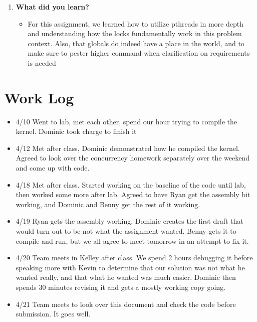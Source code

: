 \documentclass[IEEEtran,letterpaper,10pt,notitlepage,draftclsnofoot,onecolumn]{article}
\begin{document}
\begin{enumerate}
\item \textbf{What did you learn?}
\begin{itemize}
\item For this assignment, we learned how to utilize pthreads in more 
  depth and understanding how the locks fundamentally work in this problem context.
  Also, that globals do indeed have a place in the world, and to make sure to pester
  higher command when clarification on requirements is needed
\end{itemize}
\end{enumerate}

\section{Work Log}
\begin{itemize}
\item 4/10 Went to lab, met each other, spend our hour trying to compile the kernel. Dominic took charge to finish it
\item 4/12 Met after class, Dominic demonstrated how he compiled the kernel. Agreed to look over the concurrency homework separately over the weekend and come up with code.
\item 4/18 Met after class. Started working on the baseline of the code until lab, then worked some more after lab. Agreed to have Ryan get the assembly bit working, and Dominic and Benny get the rest of it working.
\item 4/19 Ryan gets the assembly working, Dominic creates the first draft that would turn out to be not what the assignment wanted. Benny gets it to compile and run, but we all agree to meet tomorrow in an attempt to fix it.
\item 4/20 Team meets in Kelley after class. We spend 2 hours debugging it before speaking more with Kevin to determine that our solution was not what he wanted really, and that what he wanted was much easier. Dominic then spends 30 minutes revising it and gets a mostly working copy going.
\item 4/21 Team meets to look over this document and check the code before submission. It goes well.
\end{itemize}
\end{document}
